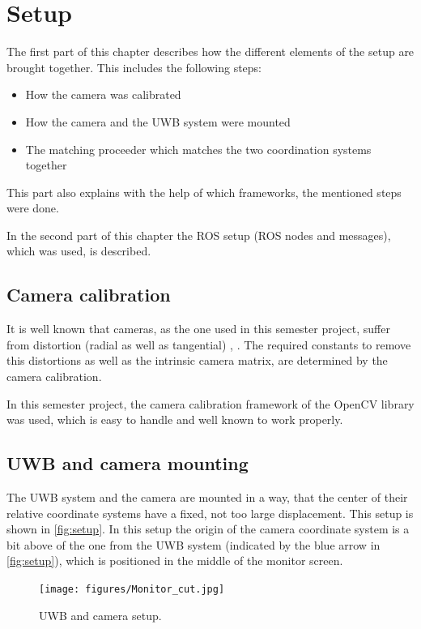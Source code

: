 
\setcounter{chapter}{2}

\chapter{Setup}\label{ch:setup}
The first part of this chapter describes how the different elements of the setup are brought together. This includes the following steps:
\begin{itemize}
	\item How the camera was calibrated
	\item How the camera and the \ac{UWB} system were mounted
	\item The matching proceeder which matches the two coordination systems together
\end{itemize}
This part also explains with the help of which frameworks, the mentioned steps were done.

In the second part of this chapter the \ac{ROS} setup (\ac{ROS} nodes and messages), which was used, is described. 

\section{Camera calibration}
It is well known that cameras, as the one used in this semester project, suffer from distortion (radial as well as tangential) \cite{Szeliski:2010:CVA:1941882}, \cite{opencv_library}. The required constants to remove this distortions as well as the intrinsic camera matrix, are determined by the camera calibration.

In this semester project, the camera calibration framework of the OpenCV library \cite{opencv_library} was used, which is easy to handle and well known to work properly.

\section{\ac{UWB} and camera mounting}
The \ac{UWB} system and the camera are mounted in a way, that the center of their relative coordinate systems have a fixed, not too large displacement. This setup is shown in \autoref{fig:setup}. In this setup the origin of the camera coordinate system is a bit above of the one from the \ac{UWB} system (indicated by the blue arrow in \autoref{fig:setup}), which is positioned in the middle of the monitor screen. 

\begin{figure}[h]\centering
	\texttt{[image: figures/Monitor\_cut.jpg]}
	\caption{\ac{UWB} and camera setup.}\label{fig:setup}
\end{figure}

